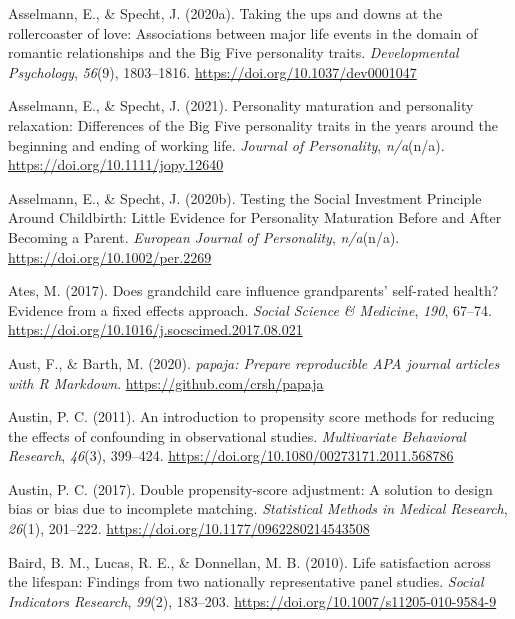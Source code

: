 \documentclass[
  english,
  man, noextraspace]{apa7}
\begin{document}
\leavevmode\hypertarget{ref-asselmannTakingUpsDowns2020}{}%
Asselmann, E., \& Specht, J. (2020a). Taking the ups and downs at the rollercoaster of love: Associations between major life events in the domain of romantic relationships and the Big Five personality traits. \emph{Developmental Psychology}, \emph{56}(9), 1803--1816. \url{https://doi.org/10.1037/dev0001047}

\leavevmode\hypertarget{ref-asselmannPersonalityMaturationPersonality2021}{}%
Asselmann, E., \& Specht, J. (2021). Personality maturation and personality relaxation: Differences of the Big Five personality traits in the years around the beginning and ending of working life. \emph{Journal of Personality}, \emph{n/a}(n/a). \url{https://doi.org/10.1111/jopy.12640}

\leavevmode\hypertarget{ref-asselmannTestingSocialInvestment2020}{}%
Asselmann, E., \& Specht, J. (2020b). Testing the Social Investment Principle Around Childbirth: Little Evidence for Personality Maturation Before and After Becoming a Parent. \emph{European Journal of Personality}, \emph{n/a}(n/a). \url{https://doi.org/10.1002/per.2269}

\leavevmode\hypertarget{ref-atesDoesGrandchildCare2017}{}%
Ates, M. (2017). Does grandchild care influence grandparents' self-rated health? Evidence from a fixed effects approach. \emph{Social Science \& Medicine}, \emph{190}, 67--74. \url{https://doi.org/10.1016/j.socscimed.2017.08.021}

\leavevmode\hypertarget{ref-R-papaja}{}%
Aust, F., \& Barth, M. (2020). \emph{papaja: Prepare reproducible APA journal articles with R Markdown}. \url{https://github.com/crsh/papaja}

\leavevmode\hypertarget{ref-austinIntroductionPropensityScore2011}{}%
Austin, P. C. (2011). An introduction to propensity score methods for reducing the effects of confounding in observational studies. \emph{Multivariate Behavioral Research}, \emph{46}(3), 399--424. \url{https://doi.org/10.1080/00273171.2011.568786}

\leavevmode\hypertarget{ref-austinDoublePropensityscoreAdjustment2017}{}%
Austin, P. C. (2017). Double propensity-score adjustment: A solution to design bias or bias due to incomplete matching. \emph{Statistical Methods in Medical Research}, \emph{26}(1), 201--222. \url{https://doi.org/10.1177/0962280214543508}

\leavevmode\hypertarget{ref-bairdLifeSatisfactionLifespan2010}{}%
Baird, B. M., Lucas, R. E., \& Donnellan, M. B. (2010). Life satisfaction across the lifespan: Findings from two nationally representative panel studies. \emph{Social Indicators Research}, \emph{99}(2), 183--203. \url{https://doi.org/10.1007/s11205-010-9584-9}
\end{document}

